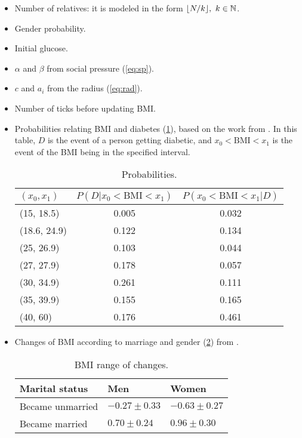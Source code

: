 \begin{itemize}
\item Number of relatives: it is modeled in the form $\lfloor N/k\rfloor, \ k\in\mathbb{N}$.
\item Gender probability.
\item Initial glucose.
\item $\alpha$ and $\beta$ from social pressure (\cref{eq:sp}).
\item $c$ and $a_i$ from the radius (\cref{eq:rad}).
\item Number of ticks before updating BMI.
\item Probabilities relating BMI and diabetes (\cref{tab:probs}), based on the work from \cite{bays2007relationship}. In this table, $D$ is the event of a person getting diabetic, and $x_0<\text{BMI}<x_1$ is the event of the BMI being in the specified interval.
\begin{table}[H]
\centering
\begin{tabular}{lcc}
\hline
             $(x_0, x_1)$ & $P(D|x_0 < \text{BMI} < x_1)$ & $P(x_0 < \text{BMI} < x_1|D)$ \\ \hline
(15, 18.5)   & 0.005                         & 0.032                         \\
(18.6, 24.9) & 0.122                         & 0.134                         \\
(25, 26.9)   & 0.103                         & 0.044                         \\
(27, 27.9)   & 0.178                         & 0.057                         \\
(30, 34.9)   & 0.261                         & 0.111                         \\
(35, 39.9)   & 0.155                         & 0.165                         \\
(40, 60)     & 0.176                         & 0.461                         \\ \hline
\end{tabular}
\caption{Probabilities.}
\label{tab:probs}
\end{table}

\item Changes of BMI according to marriage and gender (\cref{tab:bmi}) from \cite{jeffery2002cross}.
\begin{table}[H]
\centering
\begin{tabular}{lll}
\hline
\textbf{Marital status} & \textbf{Men}     & \textbf{Women}   \\ \hline
Became unmarried        & $-0.27 \pm 0.33$ & $-0.63 \pm 0.27$ \\
Became married          & $0.70 \pm 0.24$  & $0.96 \pm 0.30$  \\ \hline
\end{tabular}
\caption{BMI range of changes.}
\label{tab:bmi}
\end{table}

\end{itemize}
